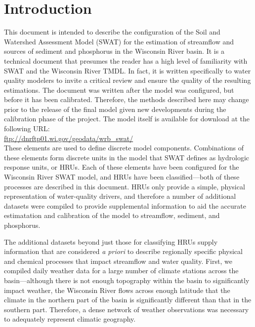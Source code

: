 \section{Introduction}
This document is intended to describe the configuration of the Soil and
Watershed Assessment Model (SWAT) for the estimation of streamflow and sources
of sediment and phosphorus in the Wisconsin River basin. It is a technical
document that presumes the reader has a high level of familiarity with SWAT and
the Wisconsin River TMDL. In fact, it is written specifically to water quality
modelers to invite a critical review and ensure the quality of the resulting
estimations. The document was written after the model was configured, but before
it has been calibrated. Therefore, the methods described here may change prior
to the release of the final model given new developments during the calibration
phase of the project. The model itself is available for download at the following URL: \\

\url{ftp://dnrftp01.wi.gov/geodata/wrb_swat/} \\



These elements are used to define discrete model components. Combinations of
these elements form discrete units in the model that SWAT defines as hydrologic
response units, or HRUs. Each of these elements have been configured for the
Wisconsin River SWAT model, and HRUs have been classified---both of these
processes are described in this document. HRUs only provide a simple, physical
representation of water-quality drivers, and therefore a number of additional
datasets were compiled to provide supplemental information to aid the accurate estimatation
and calibration of the model to streamflow, sediment, and phosphorus.

The additional datasets beyond just those for classifying HRUs supply
information that are considered \textit{a priori} to describe regionally
specific physical and chemical processes that impact streamflow and water quality.
First, we compiled daily weather data for a large number of climate
stations across the basin---although there is not enough topography within the
basin to significantly impact weather, the Wisconsin River flows across enough
latitude that the climate in the northern part of the basin is significantly
different than that in the southern part. Therefore, a dense network of weather
observations was necessary to adequately represent climatic geography.

